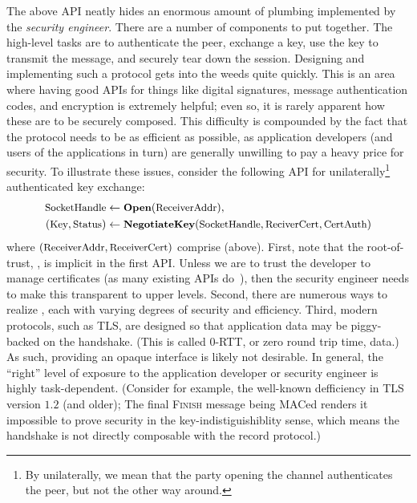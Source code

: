 The above API neatly hides an enormous amount of plumbing implemented by the
\emph{security engineer}. There are a number of components to put together. The
high-level tasks are to authenticate the peer, exchange a key, use the key to
transmit the message, and securely tear down the session. Designing and
implementing such a protocol gets into the weeds quite quickly. This is an area
where having good APIs for things like digital signatures, message
authentication codes, and encryption is extremely helpful; even so, it is rarely
apparent how these are to be securely composed. This difficulty is compounded by
the fact that the protocol needs to be as efficient as possible, as application
developers (and users of the applications in turn) are generally unwilling to
pay a heavy price for security.
%
To illustrate these issues, consider the following API for
unilaterally\footnote{By unilaterally, we mean that the party opening the
channel authenticates the peer, but not the other way around.}
authenticated key exchange:
\begin{align*}
  \textrm{\small SocketHandle} &\gets\textrm{\small\bf Open}(\textrm{\small ReceiverAddr}), \\
  (\textrm{\small Key}, \textrm{\small Status}) &\gets \textrm{\small\bf NegotiateKey}(
    \textrm{\small SocketHandle}, \textrm{\small ReciverCert}, \textrm{\small CertAuth})
\end{align*}
where $(\textrm{\small ReceiverAddr}, \textrm{\small ReceiverCert})$ comprise
 (above).  First, note that the root-of-trust,
, is implicit in the first API. Unless we are to trust the
developer to manage certificates (as many existing APIs do~\cite{FHM+12}), then
the security engineer needs to make this transparent to upper levels. Second,
there are numerous ways to realize , each with varying
degrees of security and efficiency. Third, modern protocols, such as TLS, are
designed so that application data may be piggy-backed on the handshake. (This is
called 0-RTT, or zero round trip time, data.) As such,
providing an opaque interface is likely not desirable. In general, the ``right''
level of exposure to the application developer or security engineer is highly
task-dependent.
%
  (Consider for example, the well-known defficiency in TLS version $1.2$ (and
  older); The final \textsc{Finish} message being MACed renders it impossible to
  prove security in the key-indistiguishiblity sense, which means the handshake
  is not directly composable with the record protocol.)
\fi
%
\fi

